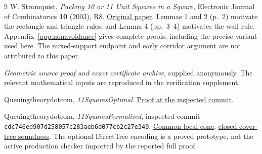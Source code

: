 \documentclass[11pt]{article}
\begin{document}
\begin{thebibliography}{9}
W. Stromquist, \emph{Packing 10 or 11 Unit Squares in a Square},
Electronic Journal of Combinatorics \textbf{10} (2003), R8.
\href{https://www.combinatorics.org/ojs/index.php/eljc/article/download/v10i1r8/pdf}{Original paper}.
Lemmas 1 and 2 (p.~2) motivate the rectangle and triangle rules, and
Lemma 4 (pp.~3--4) motivates the wall rule. Appendix~\ref{app:nonavoidance}
gives complete proofs, including the precise variant used here.
The mixed-support endpoint and early corridor argument are not attributed
to this paper.

\emph{Geometric source proof and exact certificate archive}, supplied
anonymously. The relevant mathematical inputs are reproduced in the
verification supplement.

Queuingtheorydotcom, \emph{11SquaresOptimal}.
\href{https://github.com/Queuingtheorydotcom/11SquaresOptimal/blob/f9e0de713a0949d1bc6a0fa6b59d96edf6c3d65c/PROOF.md}{Proof at the inspected commit}.

Queuingtheorydotcom, \emph{11SquaresFormalized}, inspected commit
\texttt{cdc746ed907d258057c283aeb6d077cb2c27e349}.
\href{https://github.com/Queuingtheorydotcom/11SquaresFormalized/tree/cdc746ed907d258057c283aeb6d077cb2c27e349/ElevenSquare/Simplified}{Common local cone},
\href{https://github.com/Queuingtheorydotcom/11SquaresFormalized/blob/cdc746ed907d258057c283aeb6d077cb2c27e349/ElevenSquare/Tasks/T07/Ext/Check.lean}{closed cover-tree soundness}.
The optional DirectTree encoding is a proved prototype, not the active
production checker imported by the reported full proof.

\end{thebibliography}
\end{document}
